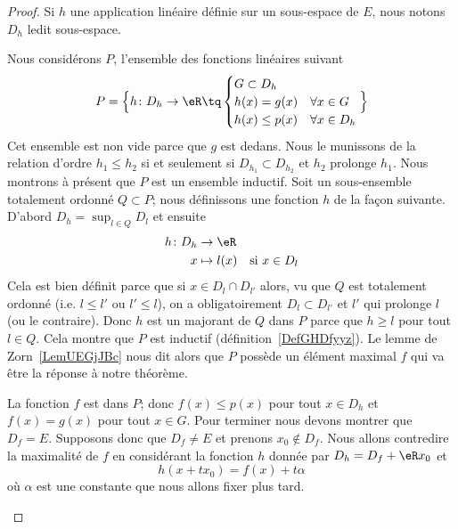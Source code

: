 	\begin{proof}
		Si \( h\) une application linéaire définie sur un sous-espace de \( E\), nous notons \( D_h\) ledit sous-espace.

		\begin{subproof}

			Nous considérons \( P\), l'ensemble des fonctions linéaires suivant
			\begin{equation}
				P=\Big\{  h\colon D_h\to \eR\tq
				\begin{cases}
					G\subset D_h                     \\
					h(x)=g(x)     & \forall x\in G   \\
					h(x)\leq p(x) & \forall x\in D_h
				\end{cases}
				\Big\}
			\end{equation}
			Cet ensemble est non vide parce que \( g\) est dedans. Nous le munissons de la relation d'ordre \( h_1\leq h_2\) si et seulement si \( D_{h_1}\subset D_{h_2}\) et \( h_2\) prolonge \( h_1\). Nous montrons à présent que \( P\) est un ensemble inductif. Soit un sous-ensemble totalement ordonné \( Q\subset P\); nous définissons une fonction \( h\) de la façon suivante. D'abord \( D_h=\sup_{l\in Q}D_l\) et ensuite
			\begin{equation}
				\begin{aligned}
					h\colon D_h & \to \eR                            \\
					x           & \mapsto l(x) & \text{si } x\in D_l
				\end{aligned}
			\end{equation}
			Cela est bien définit parce que si \( x\in D_l\cap D_{l'}\) alors, vu que \( Q\) est totalement ordonné (i.e. \( l\leq l'\) ou \( l'\leq l\)), on a obligatoirement \( D_l\subset D_{l'}\) et \( l'\) qui prolonge \( l\) (ou le contraire). Donc \( h\) est un majorant de \( Q\) dans \( P\) parce que \( h\geq l\) pour tout \( l\in Q\). Cela montre que \( P\) est inductif (définition~\ref{DefGHDfyyz}). Le lemme de Zorn~\ref{LemUEGjJBc} nous dit alors que \( P\) possède un élément maximal \( f\) qui va être la réponse à notre théorème.

			\spitem[Le support de \( f\)]

			La fonction \( f\) est dans \( P\); donc \( f(x)\leq p(x)\) pour tout \( x\in D_h\) et \( f(x)=g(x)\) pour tout \( x\in G\). Pour terminer nous devons montrer que \( D_f=E\). Supposons donc que \( D_f\neq E\) et prenons \( x_0\notin D_f\). Nous allons contredire la maximalité de \( f\) en considérant la fonction \( h\) donnée par \( D_h=D_f+\eR x_0 \) et
			\begin{equation}
				h(x+tx_0)=f(x)+t\alpha
			\end{equation}
			où \( \alpha\) est une constante que nous allons fixer plus tard.


\end{subproof}
\end{proof}
